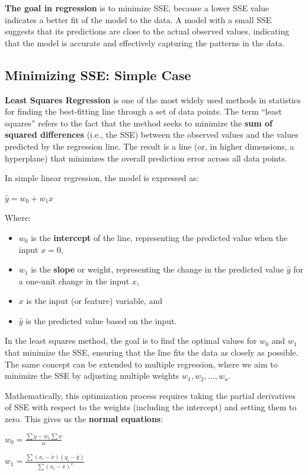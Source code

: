     \textbf{The goal in regression} is to minimize SSE, because a lower SSE value indicates a better fit of the model to the data. A model with a small SSE suggests that its predictions are close to the actual observed values, indicating that the model is accurate and effectively capturing the patterns in the data.
\subsection{Minimizing SSE: Simple Case}
    \large \textbf{Least Squares Regression} is one of the most widely used methods in statistics for finding the best-fitting line through a set of data points. The term “least squares” refers to the fact that the method seeks to minimize the \textbf{sum of squared differences} (i.e., the SSE) between the observed values and the values predicted by the regression line. The result is a line (or, in higher dimensions, a hyperplane) that minimizes the overall prediction error across all data points.

    In simple linear regression, the model is expressed as:
    \begin{center}
        \( \hat{y} = w_0 + w_1x \)
    \end{center}
    Where:
    \begin{itemize}
        \item \( w_0 \) is the \textbf{intercept} of the line, representing the predicted value when the input \( x = 0 \),
        \item \( w_1 \) is the \textbf{slope} or weight, representing the change in the predicted value \( \hat{y} \) for a one-unit change in the input \( x \),
        \item \( x \) is the input (or feature) variable, and
        \item \( \hat{y} \) is the predicted value based on the input.
    \end{itemize}

    In the least squares method, the goal is to find the optimal values for \( w_0 \) and \( w_1 \) that minimize the SSE, ensuring that the line fits the data as closely as possible. The same concept can be extended to multiple regression, where we aim to minimize the SSE by adjusting multiple weights \( w_1, w_2, ..., w_n \).

    Mathematically, this optimization process requires taking the partial derivatives of SSE with respect to the weights (including the intercept) and setting them to zero. This gives us the \textbf{normal equations}:
    \begin{center}
        \( w_0 = \frac{\sum y - w_1\sum x}{n} \)
    \end{center}
    \begin{center}
        \( w_1 = \frac{\sum(x_i - \bar{x})(y_i - \bar{y})}{\sum(x_i - \bar{x})^2} \)
    \end{center}

